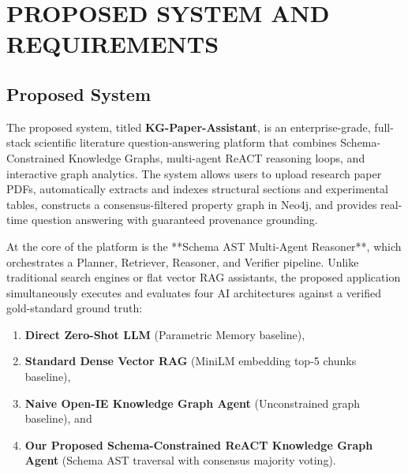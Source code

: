 \chapter{PROPOSED SYSTEM AND REQUIREMENTS}

\section{Proposed System}
The proposed system, titled \textbf{KG-Paper-Assistant}, is an enterprise-grade, full-stack scientific literature question-answering platform that combines Schema-Constrained Knowledge Graphs, multi-agent ReACT reasoning loops, and interactive graph analytics. The system allows users to upload research paper PDFs, automatically extracts and indexes structural sections and experimental tables, constructs a consensus-filtered property graph in Neo4j, and provides real-time question answering with guaranteed provenance grounding.

At the core of the platform is the **Schema AST Multi-Agent Reasoner**, which orchestrates a Planner, Retriever, Reasoner, and Verifier pipeline. Unlike traditional search engines or flat vector RAG assistants, the proposed application simultaneously executes and evaluates four AI architectures against a verified gold-standard ground truth:
\begin{enumerate}
    \item \textbf{Direct Zero-Shot LLM} (Parametric Memory baseline),
    \item \textbf{Standard Dense Vector RAG} (MiniLM embedding top-5 chunks baseline),
    \item \textbf{Naive Open-IE Knowledge Graph Agent} (Unconstrained graph baseline), and
    \item \textbf{Our Proposed Schema-Constrained ReACT Knowledge Graph Agent} (Schema AST traversal with consensus majority voting).
\end{enumerate}

